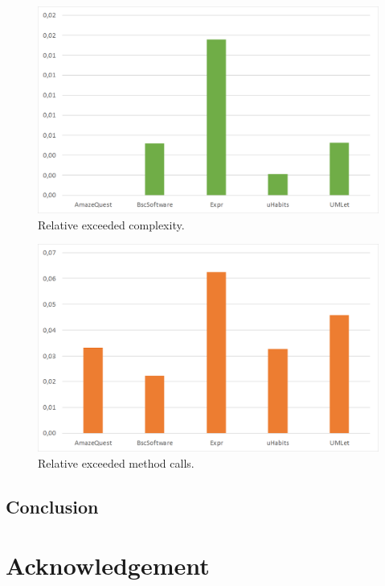 \documentclass[conference]{IEEEtran}
\begin{document}
\begin{figure}
	\includegraphics[width=\columnwidth]{img/rel_exceeded_complexity.png}
	\caption{Relative exceeded complexity.}
	\label{fig:exceed_complexity}
\end{figure}

\begin{figure}
	\includegraphics[width=\columnwidth]{img/rel_exceeded_calls.png}
	\caption{Relative exceeded method calls.}
	\label{fig:exceed_calls}
\end{figure}

\subsection{Conclusion}



\section{Acknowledgement}
\end{document}
